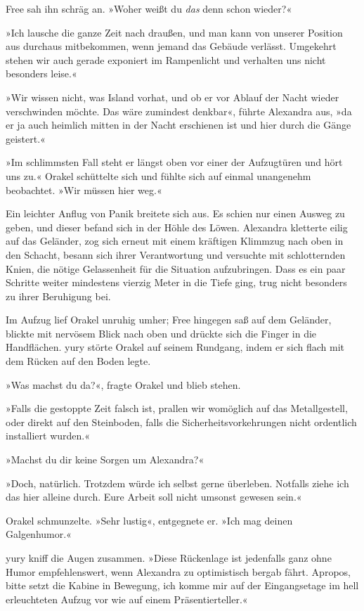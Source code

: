 Free sah ihn schräg an. »Woher weißt du \emph{das} denn schon wieder?«

»Ich lausche die ganze Zeit nach draußen, und man kann von unserer Position aus durchaus mitbekommen, wenn jemand das Gebäude verlässt. Umgekehrt stehen wir auch gerade exponiert im Rampenlicht und verhalten uns nicht besonders leise.«

»Wir wissen nicht, was Island vorhat, und ob er vor Ablauf der Nacht wieder verschwinden möchte. Das wäre zumindest denkbar«, führte Alexandra aus, »da er ja auch heimlich mitten in der Nacht erschienen ist und hier durch die Gänge geistert.«

»Im schlimmsten Fall steht er längst oben vor einer der Aufzugtüren und hört uns zu.« Orakel schüttelte sich und fühlte sich auf einmal unangenehm beobachtet. »Wir müssen hier weg.«

Ein leichter Anflug von Panik breitete sich aus. Es schien nur einen Ausweg zu geben, und dieser befand sich in der Höhle des Löwen. Alexandra kletterte eilig auf das Geländer, zog sich erneut mit einem kräftigen Klimmzug nach oben in den Schacht, besann sich ihrer Verantwortung und versuchte mit schlotternden Knien, die nötige Gelassenheit für die Situation aufzubringen. Dass es ein paar Schritte weiter mindestens vierzig Meter in die Tiefe ging, trug nicht besonders zu ihrer Beruhigung bei.

Im Aufzug lief Orakel unruhig umher; Free hingegen saß auf dem Geländer, blickte mit nervösem Blick nach oben und drückte sich die Finger in die Handflächen. yury störte Orakel auf seinem Rundgang, indem er sich flach mit dem Rücken auf den Boden legte.

»Was machst du da?«, fragte Orakel und blieb stehen.

»Falls die gestoppte Zeit falsch ist, prallen wir womöglich auf das Metallgestell, oder direkt auf den Steinboden, falls die Sicherheitsvorkehrungen nicht ordentlich installiert wurden.«

»Machst du dir keine Sorgen um Alexandra?«

»Doch, natürlich. Trotzdem würde ich selbst gerne überleben. Notfalls ziehe ich das hier alleine durch. Eure Arbeit soll nicht umsonst gewesen sein.«

Orakel schmunzelte. »Sehr lustig«, entgegnete er. »Ich mag deinen Galgenhumor.«

yury kniff die Augen zusammen. »Diese Rückenlage ist jedenfalls ganz ohne Humor empfehlenswert, wenn Alexandra zu optimistisch bergab fährt. Apropos, bitte setzt die Kabine in Bewegung, ich komme mir auf der Eingangsetage im hell erleuchteten Aufzug vor wie auf einem Präsentierteller.«

